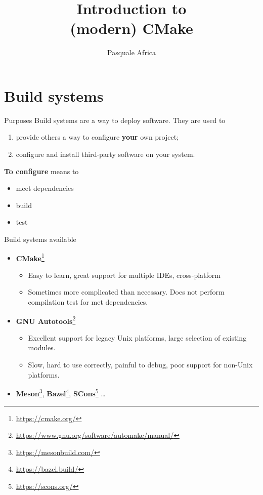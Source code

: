 \documentclass[aspectratio=169,11pt]{beamer}
\title{Introduction to \texorpdfstring{\\}{}(modern) CMake}
\author{\texorpdfstring{\vspace{2\baselineskip}}{}
        Pasquale Africa}
\institute{}
\date{}
\newcommand{\pro}{\textcolor{example}{\ding{51}}}
\newcommand{\con}{\alert{\ding{55}}}
\begin{document}
\begin{frame}[plain]{}
    \maketitle
\end{frame}

\section{Build systems}
\begin{frame}{Purposes}
    Build systems are a way to deploy software.
    \vfill
    They are used to
    \begin{enumerate}
        \item provide others a way to configure \textbf{your} own project;
        \item configure and install third-party software on your system.
    \end{enumerate}
    \vfill
    \textbf{To configure} means to
    \begin{itemize}
        \item meet dependencies
        \item build
        \item test
    \end{itemize}
\end{frame}

\begin{frame}{Build systems available}
    \begin{itemize}
    \item \textbf{CMake}\footnote{\url{https://cmake.org/}}
    \begin{itemize}
    \item[\pro] Easy to learn, great support for multiple IDEs, cross-platform
    \item[\con] Sometimes more complicated than necessary. Does not perform compilation test for met dependencies.
    \end{itemize}
    \item \textbf{GNU Autotools}\footnote{\url{https://www.gnu.org/software/automake/manual/}}
    \begin{itemize}
    \item[\pro] Excellent support for legacy Unix platforms, large selection of existing modules.
    \item[\con] Slow, hard to use correctly, painful to debug, poor support for non-Unix platforms.
    \end{itemize}
    \item \textbf{Meson}\footnote{\url{https://mesonbuild.com/}}, \textbf{Bazel}\footnote{\url{https://bazel.build/}}, \textbf{SCons}\footnote{\url{https://scons.org/}} \dots
    \end{itemize}
\end{frame}
\end{document}
